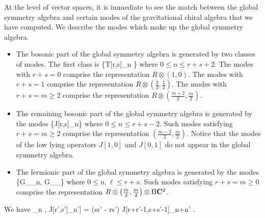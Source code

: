 \documentclass[../main.tex]{subfiles}
\begin{document}
At the level of vector spaces, it is immediate to see the match between the global symmetry algebra and certain modes of the gravitational chiral algebra that we have computed.
We describe the modes which make up the global symmetry algebra.
\begin{itemize}
\item The bosonic part of the global symmetry algebra is generated by two classes of modes.
The first class is
\beqn
\{T[r,s]_n \}
\eeqn
where $0 \leq n \leq r + s + 2$.
The modes with $r + s = 0$ comprise the representation $R \otimes (1,0)$.
The modes with $r + s = 1$ comprise the representation $R \otimes \left(\frac32,\frac12\right)$.
The modes with $r + s = m \geq 2$ comprise the representation $R \otimes \left(\frac{m+2}{2}, \frac{m}{2}\right)$.
\item 
The remaining bosonic part of the global symmetry algebra is generated by the modes
\beqn
\{J[r,s]_n\}
\eeqn
where $0 \leq n \leq r + s - 2$.
Such modes satisfying $r + s = m \geq 2$ comprise the representation $\left(\frac{m-2}{2},\frac{m}2\right)$.
Notice that the modes of the low lying operators $J[1,0]$ and $J[0,1]$ do not appear in the global symmetry algebra.
\item The fermionic part of the global symmetry algebra is generated by the modes
\beqn
\{G_\alpha[r,s]_n, G_\gamma[r,s]_\ell\}
\eeqn
where $0 \leq n,\ell \leq r + s$.
Such modes satisfying $r + s = m \geq 0$ comprise the representation $R \otimes \left(\frac{m}{2}, \frac{m}{2} \right) \otimes \Pi \mathbf{C}^2$.
\end{itemize}

We have
\beqn
[J[r,s]_n , J[r',s']_{n'}] = (sr' - rs') J[r+r'-1,s+s'-1]_{n+n'} .
\eeqn
\end{document}
